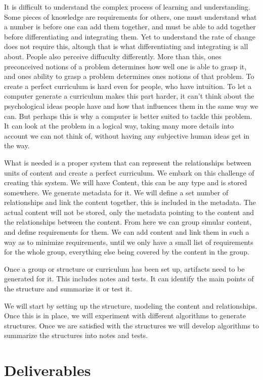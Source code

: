 \documentclass[a4paper]{article}
\begin{document}
It is difficult to understand the complex process of learning and understanding. Some pieces of knowledge are requirements for others, one must understand what a number is before one can add them together, and must be able to add together before differentiating and integrating them. Yet to understand the rate of change does not require this, altough that is what differentiating and integrating is all about. People also perceive diffuculty differently. More than this, ones preconceived notions of a problem determines how well one is able to grasp it, and ones ability to grasp a problem determines ones notions of that problem. To create a perfect curriculum is hard even for people, who have intuition. To let a computer generate a curriculum makes this part harder, it can't think about the psychological ideas people have and how that influences them in the same way we can. But perhaps this is why a computer is better suited to tackle this problem. It can look at the problem in a logical way, taking many more details into account we can not think of, without having any subjective human ideas get in the way.

What is needed is a proper system that can represent the relationships between units of content and create a perfect curriculum. We embark on this challenge of creating this system. We will have Content, this can be any type and is stored somewhere. We generate metadata for it. We will define a set number of relationships and link the content together, this is included in the metadata. The actual content will not be stored, only the metadata pointing to the content and the relationships between the content. From here we can group simular content, and define requirements for them. We can add content and link them in such a way as to minimize requirements, until we only have a small list of requirements for the whole group, everything else being covered by the content in the group.

Once a group or structure or curriculum has been set up, artifacts need to be generated for it. This includes notes and tests. It can identify the main points of the structure and summarize it or test it.

We will start by setting up the structure, modeling the content and relationships. Once this is in place, we will experiment with different algorithms to generate structures. Once we are satisfied with the structures we will develop algorithms to summarize the structures into notes and tests.


	\section{Deliverables}
    
\end{document}
